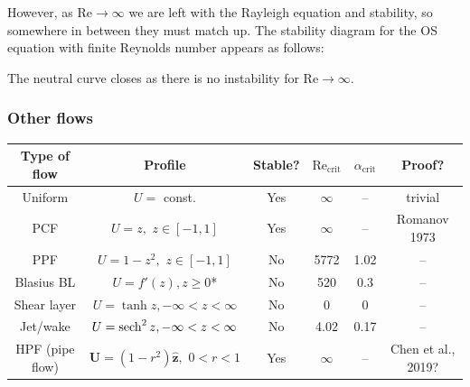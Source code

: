 \documentclass{jknotes}
\newcommand{\ReN}{\text{Re}}
\begin{document}
However, as $\ReN \to \infty$ we are left with the Rayleigh equation and
stability, so somewhere in between they must match up. The stability diagram
for the OS equation with finite Reynolds number appears as follows:
\begin{center}
\end{center}

The neutral curve closes as there is no instability for $\ReN \to \infty$.

\subsubsection{Other flows}
\begin{table}[h]
	\begin{tabular}{c|ccccc}
		Type of flow & Profile & Stable? & $\ReN_{\text{crit}}$ &
		$\alpha_{\text{crit}}$ & Proof? \\ \hline
		Uniform & $U =$ const. & Yes & $\infty$ & -- & trivial \\
		PCF & $U = z, \,\,z \in \left[-1,1\right]$ & Yes & $\infty$ & -- &
		Romanov 1973 \\
		PPF & $U = 1-z^2,\,\, z \in \left[-1,1\right]$ & No & 5772 & 1.02 & --
		\\
		Blasius BL & $U = f'(z), z \ge 0$* & No & 520 & 0.3 & -- \\
		Shear layer & $U = \tanh z, -\infty < z < \infty$ & No & 0 & 0 & -- \\
		Jet/wake & $U = \sech^2 z, -\infty < z < \infty$ & No & 4.02 & 0.17 &
		-- \\
		HPF (pipe flow) & $\symbf{U} = (1-r^2)\hat{\symbf{z}},\,\, 0 < r < 1$
						& Yes & $\infty$ & -- & Chen et al., 2019?
	\end{tabular}
\end{table}
\end{document}
